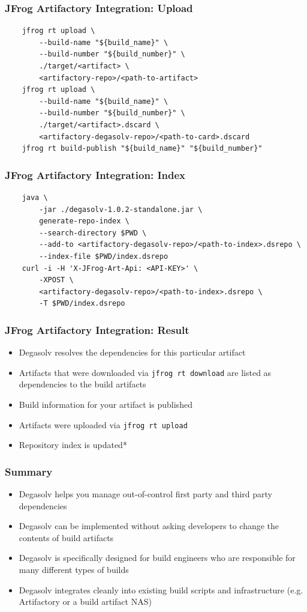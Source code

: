 \documentclass{beamer}
\begin{document}
\begin{frame}[fragile]
\frametitle{JFrog Artifactory Integration: Upload}
\begin{verbatim}
    jfrog rt upload \
        --build-name "${build_name}" \
        --build-number "${build_number}" \
        ./target/<artifact> \
        <artifactory-repo>/<path-to-artifact>
    jfrog rt upload \
        --build-name "${build_name}" \
        --build-number "${build_number}" \
        ./target/<artifact>.dscard \
        <artifactory-degasolv-repo>/<path-to-card>.dscard
    jfrog rt build-publish "${build_name}" "${build_number}"
\end{verbatim}
\end{frame}
\begin{frame}[fragile]
\frametitle{JFrog Artifactory Integration: Index}
\begin{verbatim}
    java \
        -jar ./degasolv-1.0.2-standalone.jar \
        generate-repo-index \
        --search-directory $PWD \
        --add-to <artifactory-degasolv-repo>/<path-to-index>.dsrepo \
        --index-file $PWD/index.dsrepo
    curl -i -H 'X-JFrog-Art-Api: <API-KEY>' \
        -XPOST \
        <artifactory-degasolv-repo>/<path-to-index>.dsrepo \
        -T $PWD/index.dsrepo
\end{verbatim}
\end{frame}
\begin{frame}
  \frametitle{JFrog Artifactory Integration: Result}
  \begin{itemize}
  \item Degasolv resolves the dependencies for this particular artifact
  \item Artifacts that were downloaded via \texttt{jfrog rt download} are listed as
    dependencies to the build artifacts
  \item Build information for your artifact is published
  \item Artifacts were uploaded via \texttt{jfrog rt upload}
  \item Repository index is updated*
  \end{itemize}
\end{frame}
\begin{frame}
  \frametitle{Summary}
  \begin{itemize}
  \item Degasolv helps you manage out-of-control first party and third party dependencies
  \item Degasolv can be implemented without asking developers to change the contents
    of build artifacts
  \item Degasolv is specifically designed for build engineers who are responsible for
    many different types of builds
  \item Degasolv integrates cleanly into existing build scripts and infrastructure (e.g.
    Artifactory or a build artifact NAS)
  \end{itemize}
  \end{frame}
\end{document}
